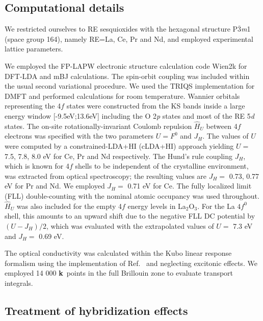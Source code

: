 \documentclass[aps,prb,twocolumn,amsmath,amssymb]{revtex4}
\def\vk{{\bf k}}
\begin{document}
\subsection{Computational details}

We restricted ourselves to RE sesquioxides with the hexagonal structure P$\overline{3}$\textit{m}1 (space group 164), namely RE=La, Ce, Pr and Nd\cite{Adachi1998}, and employed experimental lattice parameters\cite{Adachi1998}.

We employed  the FP-LAPW electronic structure calculation code Wien2k\cite{Wien2k} for DFT-LDA and mBJ calculations. The spin-orbit coupling was included within the usual second variational procedure.
We used the  TRIQS\cite{triqs_main,triqs_dft_tools} implementation for DMFT and performed calculations 
for 
room temperature. Wannier orbitals representing the 4$f$ states were constructed from the KS bands inside a large energy window [-9.5eV;13.6eV] including the O 2\textit{p} states and most of the RE 5\textit{d} states.  The on-site rotationally-invariant Coulomb repulsion $\hat{H}_{U}$ 
between 4$f$ electrons was specified with the two parameters $U=F^0$ and $J_{H}$. The values of $U$ were computed by a constrained-LDA+HI (cLDA+HI) approach\cite{cDFTHI_paper} yielding $U=$ 7.5, 7.8, 8.0 eV for Ce, Pr and Nd respectively. The Hund's rule coupling $J_{H}$, which is known for 4$f$ shells to be independent of the crystalline environment, was extracted from optical spectroscopy\cite{Carnall1989}; the resulting values are $J_{H}=$ 0.73, 0.77 eV for Pr and Nd. We employed $J_{H}=$ 0.71 eV for Ce. The fully localized limit (FLL) double-counting with the nominal atomic occupancy\cite{Pourovskii2007} was used throughout. $\hat{H}_{U}$  was also included for 
the empty 4$f$ energy levels in La$_{2}$O$_{3}$. For the La $4f^0$ shell, this amounts to an upward shift due to the negative FLL DC potential by $(U-J_H)/2$, which was evaluated with the extrapolated values of $U=$ 7.3 eV and $J_{H}=$ 0.69 eV.

The optical conductivity was calculated within the Kubo linear response formalism\cite{Kotliar2006} using the implementation of Ref.~ and neglecting excitonic effects. We employed 14 000 \vk\ points in the full Brillouin zone to evaluate transport integrals.  

\subsection{Treatment of hybridization effects}
\end{document}
